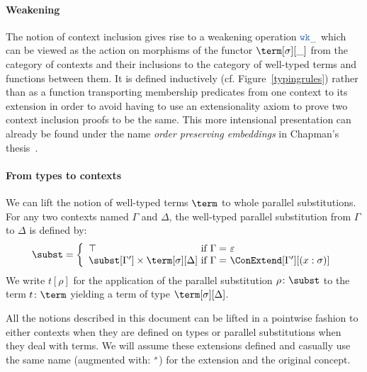 \documentclass[preprint]{sigplanconf}
\begin{document}
\paragraph{Weakening} The notion of context inclusion
gives rise to a weakening operation $\weaken[\_]$ which can be viewed as
the action on morphisms of the functor $\term[\sigma][\_]$ from the
category of contexts and their inclusions to the category of well-typed
terms and functions between them. It is defined inductively (cf.
Figure~\ref{typingrules}) rather than as a function transporting
membership predicates from one context to its extension in order to
avoid having to use an extensionality axiom to prove two context inclusion
proofs to be the same. This more intensional presentation can already be
found under the name \textit{order preserving embeddings} in Chapman's
thesis~\cite{ChapmanPhd}.

\paragraph{From types to contexts} We can lift the notion of well-typed
terms $\term$ to whole parallel substitutions. For any two contexts named
$\Gamma$ and $\Delta$, the well-typed parallel substitution from $\Gamma$
to $\Delta$ is defined by:
$$\subst = \left\lbrace
\begin{array}{l@{\text{ if }\Gamma =~}l}
\top & \varepsilon \\
\subst[\Gamma'] \times \term[\sigma][\Delta]
  & \ConExtend[\Gamma'][(x : \sigma)]
\end{array}\right.$$
We write $t [ \rho ]$ for the application of the parallel substitution $\rho \colon \subst$
to the term $t \colon \term$ yielding a term of type $\term[\sigma][\Delta]$.

\begin{remark}
All the notions described in this document can be lifted in a pointwise
fashion to either contexts when they are defined on types or parallel
substitutions when they deal with terms. We will assume these extensions
defined and casually use the same name (augmented with: $^s$)
for the extension and the original concept.
\end{remark}

\end{document}
